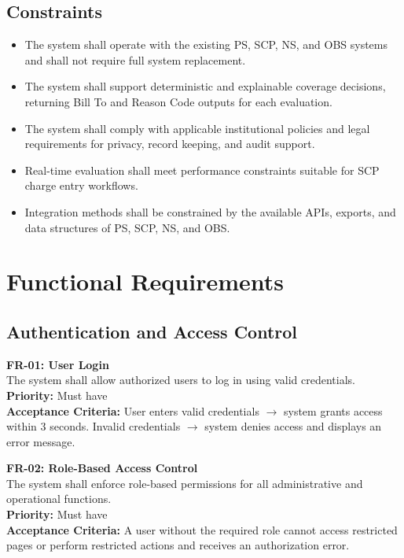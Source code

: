 \documentclass[12pt,a4paper]{article}
\begin{document}
\subsection{Constraints}
\begin{itemize}
  \item The system shall operate with the existing PS, SCP, NS, and OBS systems and shall not require full system replacement.
  \item The system shall support deterministic and explainable coverage decisions, returning Bill To and Reason Code outputs for each evaluation.
  \item The system shall comply with applicable institutional policies and legal requirements for privacy, record keeping, and audit support.
  \item Real-time evaluation shall meet performance constraints suitable for SCP charge entry workflows.
  \item Integration methods shall be constrained by the available APIs, exports, and data structures of PS, SCP, NS, and OBS.
\end{itemize}

\section{Functional Requirements}

\subsection{Authentication and Access Control}

\textbf{FR-01: User Login}\\
The system shall allow authorized users to log in using valid credentials.\\
\textbf{Priority:} Must have\\
\textbf{Acceptance Criteria:} User enters valid credentials $\rightarrow$ system grants access within 3 seconds. Invalid credentials $\rightarrow$ system denies access and displays an error message.

\textbf{FR-02: Role-Based Access Control}\\
The system shall enforce role-based permissions for all administrative and operational functions.\\
\textbf{Priority:} Must have\\
\textbf{Acceptance Criteria:} A user without the required role cannot access restricted pages or perform restricted actions and receives an authorization error.
\end{document}
